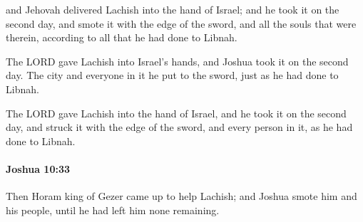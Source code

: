 			\begin{versebox}
					\item[BHS] 
					\item[ASV] and Jehovah delivered Lachish into the hand of Israel; and he took it on the second day, and smote it with the edge of the sword, and all the souls that were therein, according to all that he had done to Libnah.
					\item[NIV] The LORD gave Lachish into Israel’s hands, and Joshua took it on the second day. The city and everyone in it he put to the sword, just as he had done to Libnah.
					\item[NRSV] The LORD gave Lachish into the hand of Israel, and he took it on the second day, and struck it with the edge of the sword, and every person in it, as he had done to Libnah.
			\end{versebox}

		\paragraph{Joshua 10:33} %
			\label{JOSHUA-10-33}

			Then Horam king of Gezer came up to help Lachish; and Joshua smote him and his people, until he had left him none remaining.

